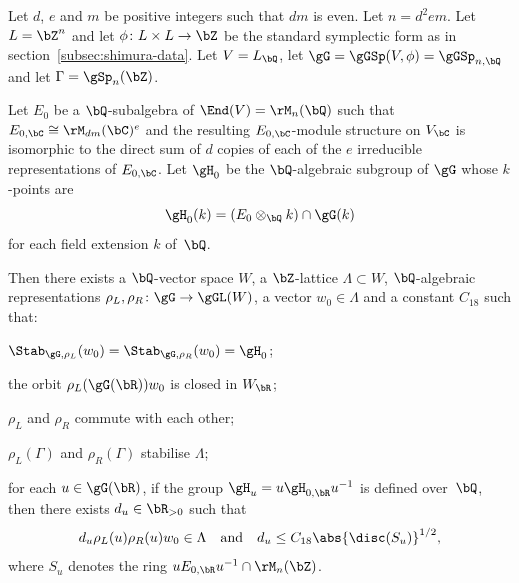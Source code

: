 \begin{proposition} \label{reps-closed-orbits}
Let $d$, $e$ and $m$ be positive integers such that $dm$ is even.
Let $n = d^2em$.
Let $L = \bZ^n$ and let $\phi \colon L \times L \to \bZ$ be the standard symplectic form as in section~\ref{subsec:shimura-data}.
Let $V = L_\bQ$, let $\gG = \gGSp(V, \phi) = \gGSp_{n,\bQ}$ and let $\Gamma = \gSp_n(\bZ)$.

Let $E_0$ be a $\bQ$-subalgebra of $\End(V) = \rM_n(\bQ)$ such that $E_{0,\bC} \cong \rM_{dm}(\bC)^e$ and the resulting $E_{0,\bC}$-module structure on $V_\bC$ is isomorphic to the direct sum of $d$ copies of each of the $e$ irreducible representations of $E_{0,\bC}$.
Let $\gH_0$ be the $\bQ$-algebraic subgroup of $\gG$ whose $k$-points are
\[
\gH_0(k) = (E_0 \otimes_\bQ k) \cap \gG(k)
\]
for each field extension $k$ of~$\bQ$.

Then there exists a $\bQ$-vector space $W$, a $\bZ$-lattice $\Lambda \subset W$, $\bQ$-algebraic representations $\rho_L, \rho_R \colon \gG \to \gGL(W)$, a vector $w_0 \in \Lambda$ and a constant $C_{18}$ such that:
\begin{enumeratei}
\item \label{reps-closed-orbitsi} $\Stab_{\gG,\rho_L}(w_0) = \Stab_{\gG,\rho_R}(w_0) = \gH_0$;

\item \label{reps-closed-orbitsii} the orbit $\rho_L(\gG(\bR))w_0$ is closed in $W_\bR$;

\item \label{reps-closed-orbitsiii} $\rho_L$ and $\rho_R$ commute with each other;

\item \label{reps-closed-orbitsiv} $\rho_L(\Gamma)$ and $\rho_R(\Gamma)$ stabilise $\Lambda$;

\item \label{reps-closed-orbitsv} for each $u \in \gG(\bR)$, if the group $\gH_u = u \gH_{0,\bR} u^{-1}$ is defined over~$\bQ$, then there exists $d_u \in \bR_{>0}$ such that
\[
d_u \rho_L(u) \rho_R(u) w_0 \in \Lambda \quad \text{and} \quad d_u \leq C_{18} \abs{\disc(S_u)}^{1/2},
\]
where $S_u$ denotes the ring $u E_{0,\bR} u^{-1} \cap \rM_n(\bZ)$.
\end{enumeratei}
\end{proposition}

